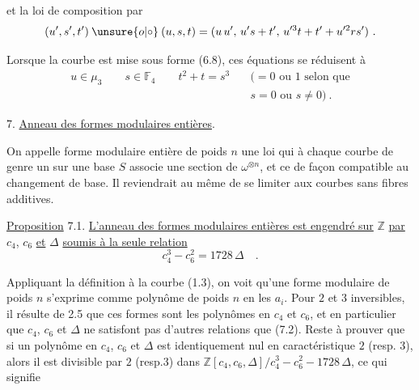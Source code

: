
et la loi de composition par
\[
(u',s',t')\mathbin{\unsure{o|\circ}}(u,s,t)=(u\,u',\,u's+t',\,u^{\prime 3}t+t'+u^{\prime 2}rs')\ .
\]

Lorsque la courbe est mise sous forme (6.8), ces équations se réduisent à
\[
\begin{aligned}
u\in\mu_3\qquad s\in\mathbb{F}_4\qquad t^2+t=s^3\quad &(=0\text{ ou }1\text{ selon que}\\
&s=0\text{ ou }s\ne0)\ .
\end{aligned}
\]

7. \uline{Anneau des formes modulaires entières}.

On appelle forme modulaire entière de poids $n$ une loi qui à chaque courbe de genre un sur une base $S$ associe une section de $\omega^{\otimes n}$, et ce de façon compatible au changement de base. Il reviendrait au même de se limiter aux courbes sans fibres additives.

\uline{Proposition} 7.1. \uline{L'anneau des formes modulaires entières est engendré sur} $\mathbb{Z}$ \uline{par} $c_4$, $c_6$ \uline{et} $\Delta$ \uline{soumis à la seule relation}
\[
c_4^3-c_6^2=1728\,\Delta\quad.\tag*{(7.2.)}
\]

Appliquant la définition à la courbe (1.3), on voit qu'une forme modulaire  de poids $n$ s'exprime comme polynôme de poids $n$ en les $a_i$. Pour $2$ et $3$ inversibles, il résulte de 2.5 que ces formes sont les polynômes en $c_4$ et $c_6$, et en particulier que $c_4$, $c_6$ et $\Delta$ ne satisfont pas d'autres relations que (7.2). Reste à prouver que si un polynôme en $c_4$, $c_6$ et $\Delta$ est identiquement nul en caractéristique $2$ (resp. $3$), alors il est divisible par $2$ (resp.$3$) dans $\mathbb{Z}[c_4,c_6,\Delta]/c_4^3-c_6^2-1728\,\Delta$, ce qui signifie

